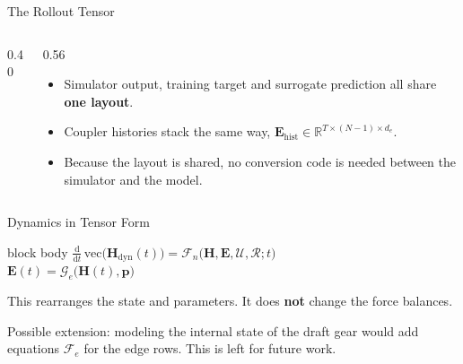 \begin{frame}{The Rollout Tensor}
  \vspace{0.2em}
  \begin{columns}[c,onlytextwidth]
    \begin{column}{0.40\textwidth}
      \centering
      \scalebox{0.92}{\rolloutTensor}
    \end{column}
    \begin{column}{0.56\textwidth}
      \begin{itemize}\setlength\itemsep{0.6em}
        \item Simulator output, training target and surrogate prediction all
              share \textbf{one layout}.
        \item Coupler histories stack the same way,
              $\mathbf{E}_{\mathrm{hist}} \in \mathbb{R}^{T \times (N-1) \times d_e}$.
        \item Because the layout is shared, no conversion code is needed
              between the simulator and the model.
      \end{itemize}
    \end{column}
  \end{columns}
\end{frame}

\begin{frame}{Dynamics in Tensor Form}
  \vspace{0.8em}
  \centering
  \begin{beamercolorbox}[wd=0.86\textwidth,sep=10pt,center]{block body}
    $\displaystyle \frac{\mathrm{d}}{\mathrm{d}t}\,\mathrm{vec}\bigl(\mathbf{H}_{\mathrm{dyn}}(t)\bigr)
      = \mathcal{F}_n\bigl(\mathbf{H}, \mathbf{E}, \mathcal{U}, \mathcal{R}; t\bigr)$
    \\[0.8em]
    $\mathbf{E}(t) = \mathcal{G}_e\bigl(\mathbf{H}(t), \mathbf{p}\bigr)$
  \end{beamercolorbox}

  \vspace{1.2em}
  \begin{minipage}{0.88\textwidth}\small
    This rearranges the state and parameters. It does \textbf{not} change the
    force balances.

    \vspace{0.5em}
    Possible extension: modeling the internal state of the draft gear would add
    equations $\mathcal{F}_e$ for the edge rows. This is left for future work.
  \end{minipage}
\end{frame}

